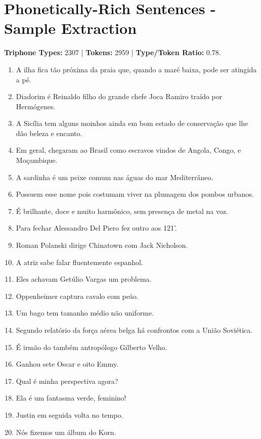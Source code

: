 \chapter{Phonetically-Rich Sentences - Sample Extraction}\label{appendix:rich-sentences}

\textbf{Triphone Types:} 2307 | \textbf{Tokens:} 2959 | \textbf{Type/Token Ratio:} 0.78.

\begin{enumerate}
\setlength\itemsep{0.5em}
\item A ilha fica t\~ao pr\'oxima da praia que, quando a mar\'e baixa, pode ser atingida a p\'e.
\item Diadorim \'e Reinaldo filho do grande chefe Joca Ramiro tra\'ido por Herm\'ogenes.
\item A Sic\'ilia tem alguns moinhos ainda em bom estado de conserva\c{c}\~ao que lhe d\~ao beleza e encanto.
\item Em geral, chegaram ao Brasil como escravos vindos de Angola, Congo, e Mo\c{c}ambique.
\item A sardinha \'e um peixe comum nas \'aguas do mar Mediterr\^aneo.
\item Possuem esse nome pois costumam viver na plumagem dos pombos urbanos.
\item \'E brilhante, doce e muito harm\^onico, sem presen\c{c}a de metal na voz.
\item Para fechar Alessandro Del Piero fez outro aos 121'.
\item Roman Polanski dirige Chinatown com Jack Nicholson.
\item A atriz sabe falar fluentemente espanhol.
\item Eles achavam Get\'ulio Vargas um problema.
\item Oppenheimer captura cavalo com pe\~ao.
\item Um bago tem tamanho m\'edio n\~ao uniforme.
\item Segundo relat\'orio da for\c{c}a a\'erea belga h\'a confrontos com a Uni\~ao Sovi\'etica.
\item \'E irm\~ao do tamb\'em antrop\'ologo Gilberto Velho.
\item Ganhou sete Oscar e oito Emmy.
\item Qual \'e minha perspectiva agora?
\item Ela \'e um fantasma verde, feminino!
\item Justin em seguida volta no tempo.
\item N\'os fizemos um \'album do Korn.

\end{enumerate}
